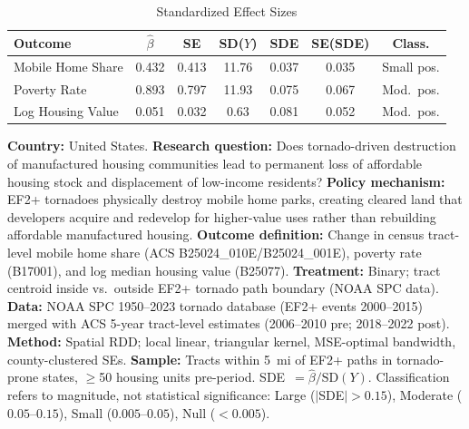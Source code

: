 \begin{table}[t]
\caption{Standardized Effect Sizes}
\label{tab:sde}
\centering
\small
\begin{tabular}{lcccccc}
\hline\hline
Outcome & $\hat{\beta}$ & SE & SD($Y$) & SDE & SE(SDE) & Class. \\
\hline
Mobile Home Share & 0.432 & 0.413 & 11.76 & 0.037 & 0.035 & Small pos. \\
Poverty Rate & 0.893 & 0.797 & 11.93 & 0.075 & 0.067 & Mod.\ pos. \\
Log Housing Value & 0.051 & 0.032 & 0.63 & 0.081 & 0.052 & Mod.\ pos. \\
\hline\hline
\end{tabular}

\vspace{0.5em}
\raggedright\scriptsize
\textbf{Country:} United States.
\textbf{Research question:} Does tornado-driven destruction of manufactured housing communities lead to permanent loss of affordable housing stock and displacement of low-income residents?
\textbf{Policy mechanism:} EF2+ tornadoes physically destroy mobile home parks, creating cleared land that developers acquire and redevelop for higher-value uses rather than rebuilding affordable manufactured housing.
\textbf{Outcome definition:} Change in census tract-level mobile home share (ACS B25024\_010E/B25024\_001E), poverty rate (B17001), and log median housing value (B25077).
\textbf{Treatment:} Binary; tract centroid inside vs.\ outside EF2+ tornado path boundary (NOAA SPC data).
\textbf{Data:} NOAA SPC 1950--2023 tornado database (EF2+ events 2000--2015) merged with ACS 5-year tract-level estimates (2006--2010 pre; 2018--2022 post).
\textbf{Method:} Spatial RDD; local linear, triangular kernel, MSE-optimal bandwidth, county-clustered SEs.
\textbf{Sample:} Tracts within 5~mi of EF2+ paths in tornado-prone states, $\geq$50 housing units pre-period.
SDE~$= \hat{\beta}/\text{SD}(Y)$. Classification refers to magnitude, not statistical significance: Large ($|$SDE$|>0.15$), Moderate ($0.05$--$0.15$), Small ($0.005$--$0.05$), Null ($<0.005$).
\end{table}
